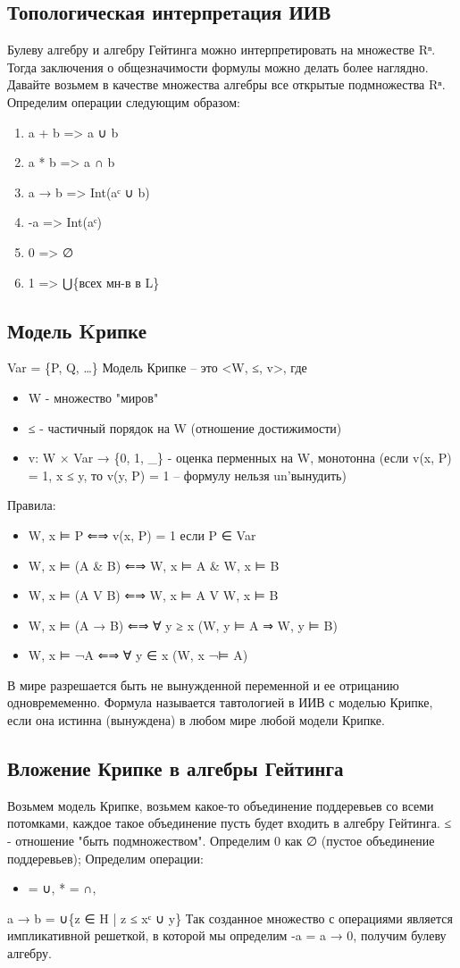 \documentclass[11pt]{article}
\begin{document}
\subsection{Топологическая интерпретация ИИВ}
\label{sec-2-10}
Булеву алгебру и алгебру Гейтинга можно интерпретировать
на множестве Rⁿ. Тогда заключения о общезначимости формулы
можно делать более наглядно.
Давайте возьмем в качестве множества алгебры все открытые
подмножества Rⁿ. Определим операции следующим образом:
\begin{enumerate}
\item a + b => a ∪ b
\item a * b => a ∩ b
\item a → b => Int(aᶜ ∪ b)
\item -a => Int(aᶜ)
\item 0 => ∅
\item 1 => ⋃\{всех мн-в в L\}
\end{enumerate}
\subsection{Модель Kрипке}
\label{sec-2-11}
Var = \{P, Q, \ldots{}\}
Модель Крипке – это <W, ≤, v>, где
\begin{itemize}
\item W - множество "миров"
\item ≤ - частичный порядок на W (отношение достижимости)
\item v: W × Var → \{0, 1, \_\} - оценка перменных на W, монотонна
(если v(x, P) = 1, x ≤ y, то v(y, P) = 1 – формулу нельзя un'вынудить)
\end{itemize}

Правила:
\begin{itemize}
\item W, x ⊨ P ⇐⇒ v(x, P) = 1 если P ∈ Var
\item W, x ⊨ (A \& B) ⇐⇒ W, x ⊨ A \& W, x ⊨ B
\item W, x ⊨ (A V B) ⇐⇒ W, x ⊨ A V W, x ⊨ B
\item W, x ⊨ (A → B) ⇐⇒ ∀ y ≥ x (W, y ⊨ A ⇒ W, y ⊨ B)
\item W, x ⊨ ¬A ⇐⇒ ∀ y ∈ x (W, x ¬⊨ A)
\end{itemize}

В мире разрешается быть не вынужденной переменной и ее отрицанию
одновремеменно.
Формула называется тавтологией в ИИВ с моделью Крипке, если она
истинна (вынуждена) в любом мире любой модели Крипке.
\subsection{Вложение Крипке в алгебры Гейтинга}
\label{sec-2-12}
Возьмем модель Крипке, возьмем какое-то объединение поддеревьев
со всеми потомками, каждое такое объединение пусть будет входить
в алгебру Гейтинга. ≤ - отношение "быть подмножеством".
Определим 0 как ∅ (пустое объединение поддеревьев);
Определим операции:
\begin{itemize}
\item = ∪, * = ∩,
\end{itemize}
a → b = ∪\{z ∈ H | z ≤ xᶜ ∪ y\}
Так созданное множество с операциями является импликативной
решеткой, в которой мы определим -a = a → 0, получим булеву алгебру.
\end{document}
